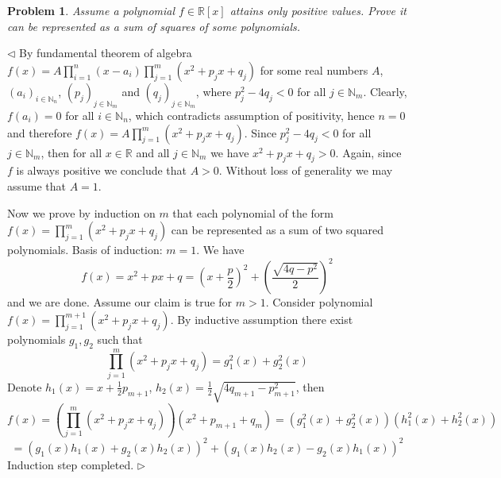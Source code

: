 \documentclass[12pt]{article}
\newtheorem{problem}{Problem}[subsection]
\newenvironment{solution}{\par $\triangleleft$}{$\triangleright$}
\begin{document}
\begin{problem} Assume a polynomial $f\in \mathbb{R}[x]$ attains only positive
values. Prove it can be represented as a sum of squares of some polynomials.
\end{problem}
\begin{solution} By fundamental theorem of algebra
    $f(x)=A\prod_{i=1}^n(x-a_i)\prod_{j=1}^m(x^2+p_j x+q_j)$ for some real
    numbers $A$, ${(a_i)}_{i\in\mathbb{N}_n}$, ${(p_j)}_{j\in\mathbb{N}_m}$ and
    ${(q_j)}_{j\in\mathbb{N}_m}$, where $p_j^2-4q_j<0$ for all
    $j\in\mathbb{N}_m$. Clearly, $f(a_i)=0$ for all $i\in\mathbb{N}_n$, which
    contradicts assumption of positivity, hence $n=0$ and therefore
    $f(x)=A\prod_{j=1}^m(x^2+p_j x+q_j)$. Since $p_j^2-4q_j<0$ for all
    $j\in\mathbb{N}_m$, then for all $x\in\mathbb{R}$ and all $j\in\mathbb{N}_m$
    we have $x^2+p_j x+q_j>0$. Again, since $f$ is always positive we conclude
    that $A>0$. Without loss of generality we may assume that $A=1$.

    Now we prove by induction on $m$ that each polynomial of the form
    $f(x)=\prod_{j=1}^m(x^2+p_j x+q_j)$ can be represented as a sum of two
    squared polynomials. Basis of induction: $m=1$. We have
    $$
        f(x)=x^2+px+q
        ={\left(x+\frac{p}{2}\right)}^2+{\left(\frac{\sqrt{4q-p^2}}{2}\right)}^2
    $$
    and we are done. Assume our claim is true for $m>1$. Consider polynomial
    $f(x)=\prod_{j=1}^{m+1} (x^2+p_j x+q_j)$. By inductive assumption there
    exist polynomials $g_1, g_2$ such that
    $$
        \prod_{j=1}^{m} (x^2+p_j x+q_j)=g_1^2(x)+g_2^2(x)
    $$
    Denote $h_1(x)=x+\frac{1}{2}p_{m+1}$,
    $h_2(x)=\frac{1}{2}\sqrt{4q_{m+1}-p_{m+1}^2}$, then
    $$
        f(x)=\left(\prod_{j=1}^{m} (x^2+p_j x+q_j)\right) (x^2+p_{m+1}+q_m)
        =(g_1^2(x)+g_2^2(x))(h_1^2(x)+h_2^2(x))
    $$
    $$
        ={(g_1(x)h_1(x)+g_2(x)h_2(x))}^2+{(g_1(x)h_2(x)-g_2(x)h_1(x))}^2
    $$
    Induction step completed.
\end{solution}
\end{document}
